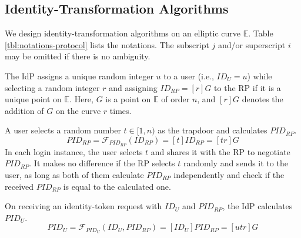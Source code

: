 
\subsection{Identity-Transformation Algorithms}
\label{subsec:overview}

We design identity-transformation algorithms %
on an elliptic curve $\mathbb{E}$.
Table \ref{tbl:notations-protocol} lists the notations. The subscript $j$ and/or superscript $i$ may be omitted if there is no ambiguity.

The IdP assigns a unique random integer $u$ to a user (i.e., $ID_U = u$) while selecting a random integer $r$ and assigning $ID_{RP} = [r]G$ to the RP if it is a unique point on $\mathbb{E}$. Here, $G$ is a point on $\mathbb{E}$ of order $n$, and $[r]G$ denotes the addition of $G$ on the curve $r$ times.




 A user selects a random number $t \in [1, n)$ as the trapdoor and calculates $PID_{RP}$.
\begin{equation}
PID_{RP} = \mathcal{F}_{PID_{RP}}(ID_{RP}) = [t]{ID_{RP}} = [tr]G
\label{equ:PIDRP}
\end{equation}
\newc
In each login instance, the user selects $t$ and shares it with the RP to negotiate $PID_{RP}$.
It makes no difference if the RP selects $t$ randomly and sends it to the user, as long as both of them calculate $PID_{RP}$ independently and check if the received $PID_{RP}$ is equal to the calculated one.

\oldc
{}
On receiving an identity-token request with $ID_U$ and $PID_{RP}$, the IdP calculates $PID_{U}$.
\begin{equation}
PID_{U} = \mathcal{F}_{PID_U}(ID_U, PID_{RP}) =
  [{ID_U}]{PID_{RP}} = [utr]G
 \label{equ:PIDU}
\end{equation}


